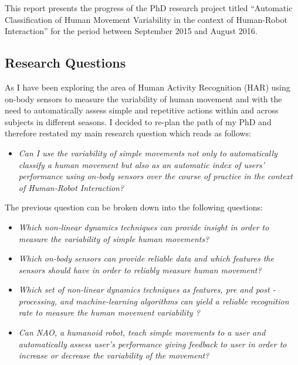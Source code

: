 \documentclass[9pt,journal,onecolumn,compsoc]{IEEEtran}
\begin{document}


This report presents the progress of the PhD research project titled
``Automatic Classification of Human Movement Variability in the context of Human-Robot Interaction'' 
for the period between September 2015 and August 2016.


\subsection{Research Questions}
As 
I have been exploring the area of Human Activity Recognition (HAR)
using on-body sensors to measure the variability of human movement 
and 
with the need to automatically assess simple and repetitive actions 
within and across subjects in different seasons.
I decided to re-plan the path of my PhD and therefore restated my main research question which reads as follows:
\begin{itemize}
 \item \textit{Can I use the variability of simple movements not only to automatically classify
 a human movement but also as an automatic index of users' performance using on-body sensors 
over the course of practice in the context
of Human-Robot Interaction?}
\end{itemize}
The previous question can be broken down into the following questions:
\begin{itemize}
 \item \textit{Which non-linear dynamics  techniques can provide insight in order to measure 
 the variability of simple human movements?}
 
 \item \textit{Which on-body sensors can provide reliable data 
 and which features the sensors should have in order to reliably measure human movement?}
 
 \item \textit{Which set of 
 non-linear dynamics techniques as features, 
 pre and post -processing, and machine-learning algorithms 
  can yield a reliable recognition rate to measure the human movement variability
  ?}
 
 \item \textit{Can NAO, a humanoid robot, 
 teach simple movements to a user and automatically assess user's performance 
 giving feedback to user in order to increase or decrease the variability of the movement?}
 
\end{itemize}
\end{document}
